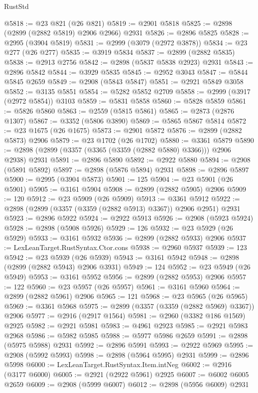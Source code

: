 \begin{lexlean}{RustStd}
\begin{coremodule}
@5818 := @23 @821 (@26 @821)
@5819 := @2901 @5818
@5825 := @2898 (@2899 (@2882 @5819) @2906 @2966) @2931
@5826 := @2896 @5825
@5828 := @2995 (@3904 @5819)
@5831 := @2999 (@3079 (@2972 @3878))
@5834 := @23 @277 (@26 @277)
@5835 := @3919 @5834
@5837 := @2899 (@2882 @5835)
@5838 := @2913 @2756
@5842 := @2898 (@5837 @5838 @2923) @2931
@5843 := @2896 @5842
@5844 := @3929 @5835
@5845 := @2952 @3043
@5847 := @5844 @5845 @2659
@5849 := @2908 (@5843 @5847)
@5851 := @2921 @5849 @3058
@5852 := @3135 @5851
@5854 := @5282 @5852 @2709
@5858 := @2999 (@3917 (@2972 @5854)) @3103
@5859 := @5831 @5858
@5860 := @5828 @5859
@5861 := @5826 @5860
@5863 := @2559 (@5815 @5861)
@5865 := @2873 (@2876 @1307)
@5867 := @3352 (@5806 @3890)
@5869 := @5865 @5867 @5814
@5872 := @23 @1675 (@26 @1675)
@5873 := @2901 @5872
@5876 := @2899 (@2882 @5873) @2906
@5879 := @23 @1702 (@26 @1702)
@5880 := @3361 @5879
@5890 := @2898 (@2899 (@3357 (@3365 (@3359 (@2882 @5880) @3366))) @2906 @2938) @2931
@5891 := @2896 @5890
@5892 := @2922 @5880
@5894 := @2908 (@5891 @5892)
@5897 := @2898 (@5876 @5894) @2931
@5898 := @2896 @5897
@5900 := @2995 (@3904 @5873)
@5901 := 125
@5904 := @23 @5901 (@26 @5901)
@5905 := @3161 @5904
@5908 := @2899 (@2882 @5905) @2906
@5909 := 120
@5912 := @23 @5909 (@26 @5909)
@5913 := @3361 @5912
@5922 := @2898 (@2899 (@3357 (@3359 (@2882 @5913) @3367)) @2906 @2951) @2931
@5923 := @2896 @5922
@5924 := @2922 @5913
@5926 := @2908 (@5923 @5924)
@5928 := @2898 (@5908 @5926)
@5929 := 126
@5932 := @23 @5929 (@26 @5929)
@5933 := @3161 @5932
@5936 := @2899 (@2882 @5933) @2906
@5937 := LexLeanTarget.RustSyntax.Ctor.cons
@5938 := @2960 @5937
@5939 := 123
@5942 := @23 @5939 (@26 @5939)
@5943 := @3161 @5942
@5948 := @2898 (@2899 (@2882 @5943) @2906 @3931)
@5949 := 124
@5952 := @23 @5949 (@26 @5949)
@5953 := @3161 @5952
@5956 := @2899 (@2882 @5953) @2906
@5957 := 122
@5960 := @23 @5957 (@26 @5957)
@5961 := @3161 @5960
@5964 := @2899 (@2882 @5961) @2906
@5965 := 121
@5968 := @23 @5965 (@26 @5965)
@5969 := @3361 @5968
@5975 := @2899 (@3357 (@3359 (@2882 @5969) @3367)) @2906
@5977 := @2916 (@2917 @1564)
@5981 := @2960 (@3382 @186 @1569) @2925
@5982 := @2921 @5981
@5983 := @4961 @2923
@5985 := @2921 @5983 @2968
@5986 := @5982 @5985
@5988 := @5977 @5986 @2659
@5991 := @2898 (@5975 @5988) @2931
@5992 := @2896 @5991
@5993 := @2922 @5969
@5995 := @2908 (@5992 @5993)
@5998 := @2898 (@5964 @5995) @2931
@5999 := @2896 @5998
@6000 := LexLeanTarget.RustSyntax.Item.intNeg
@6002 := @2916 (@3177 @6000)
@6005 := @2921 (@2922 @5961) @2925
@6007 := @6002 @6005 @2659
@6009 := @2908 (@5999 @6007)
@6012 := @2898 (@5956 @6009) @2931

\end{coremodule}
\end{lexlean}
